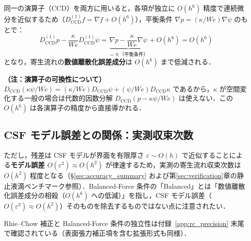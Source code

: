 同一の演算子（CCD）を両方に用いると，各項が独立に $O(h^6)$ 精度で連続微分を近似するため（$D_{\mathrm{CCD}}^{(1)} f = \nabla f + O(h^6)$），平衡条件 $\nabla p = (\kappa/We)\nabla\psi$ のもとで：
\[
  D^{(1)}_{\mathrm{CCD}} p - \frac{\kappa}{We} D^{(1)}_{\mathrm{CCD}}\psi
  = \underbrace{\nabla p - \frac{\kappa}{We}\nabla\psi}_{=\,0\;\text{（平衡条件）}} + O(h^6)
  = O(h^6)
\]
となり，寄生流れの\textbf{数値離散化誤差成分}は $O(h^6)$ まで低減される．

\noindent\textbf{（注：演算子の可換性について）}
$D_{\mathrm{CCD}}(\kappa\psi/We) = (\kappa/We)D_{\mathrm{CCD}}\psi + (\psi/We)D_{\mathrm{CCD}}\kappa$
であるから，$\kappa$ が空間変化する一般の場合は代数的因数分解 $D_{\mathrm{CCD}}(p-\kappa\psi/We)$ は使えない．この $O(h^6)$ は各演算子の精度から直接導かれる．

\subsection{CSF モデル誤差との関係：実測収束次数}

ただし，残差は CSF モデルが界面を有限厚さ $\varepsilon \sim O(h)$ で近似することによる\textbf{モデル誤差 $O(\varepsilon^2) \approx O(h^2)$} が律速するため，実測の寄生流れ収束次数は $O(h^2)$ 程度となる（§\ref{sec:accuracy_summary} および第\ref{sec:verification}章の静止液滴ベンチマーク参照）．Balanced-Force 条件の「Balanced」とは「数値離散化誤差成分の相殺（$O(h^6)$ への低減）」を指し，CSF モデル誤差（$O(\varepsilon^2) \approx O(h^2)$）そのものを除去するものではない点に注意されたい．

Rhie--Chow 補正と Balanced-Force 条件の独立性は付録~\ref{app:rc_precision} 末尾で確認されている（表面張力補正項を含む拡張形式も同様）．

